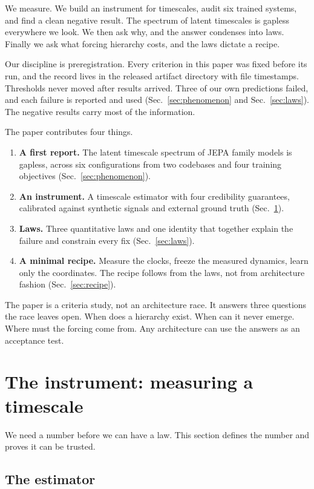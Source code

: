 \documentclass[11pt]{article}
\newcommand{\term}[1]{\textbf{#1}}
\begin{document}
We measure.
We build an instrument for timescales, audit six trained systems, and find a clean negative result.
The spectrum of latent timescales is gapless everywhere we look.
We then ask why, and the answer condenses into laws.
Finally we ask what forcing hierarchy costs, and the laws dictate a recipe.

Our discipline is preregistration.
Every criterion in this paper was fixed before its run, and the record lives in the released artifact directory with file timestamps.
Thresholds never moved after results arrived.
Three of our own predictions failed, and each failure is reported and used
(Sec.~\ref{sec:phenomenon} and Sec.~\ref{sec:laws}).
The negative results carry most of the information.

The paper contributes four things.
\begin{enumerate}
\item \term{A first report.} The latent timescale spectrum of JEPA family models is gapless, across six configurations from two codebases and four training objectives (Sec.~\ref{sec:phenomenon}).
\item \term{An instrument.} A timescale estimator with four credibility guarantees, calibrated against synthetic signals and external ground truth (Sec.~\ref{sec:instrument}).
\item \term{Laws.} Three quantitative laws and one identity that together explain the failure and constrain every fix (Sec.~\ref{sec:laws}).
\item \term{A minimal recipe.} Measure the clocks, freeze the measured dynamics, learn only the coordinates. The recipe follows from the laws, not from architecture fashion (Sec.~\ref{sec:recipe}).
\end{enumerate}

The paper is a criteria study, not an architecture race.
It answers three questions the race leaves open.
When does a hierarchy exist.
When can it never emerge.
Where must the forcing come from.
Any architecture can use the answers as an acceptance test.

\section{The instrument: measuring a timescale}
\label{sec:instrument}

We need a number before we can have a law.
This section defines the number and proves it can be trusted.

\subsection{The estimator}
\end{document}
